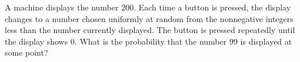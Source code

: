 A machine displays the number $200$. Each time a button is pressed, the display changes to a number chosen uniformly at random from the nonnegative integers less than the number currently displayed. The button is pressed repeatedly until the display shows $0$. What is the probability that the number $99$ is displayed at some point?
